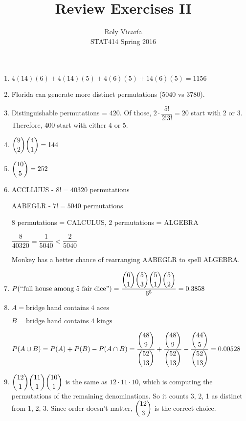 \documentclass{article}
\title{Review Exercises II}
\author{Roly Vicar\'ia \\ STAT414 Spring 2016}
\begin{document}
    
    \maketitle
    
    \begin{enumerate}
     \item
      $4(14)(6) + 4(14)(5) + 4(6)(5) + 14(6)(5) = 1156$
     
     \item
      Florida can generate more distinct permutations (5040 vs 3780).
      
     \item
      Distinguishable permutations = $420$. Of those, $2\cdot\dfrac{5!}{2!3!} = 20$ start with 2 or 3.
      Therefore, 400 start with either 4 or 5.
     
     \item
      $\dbinom{9}{2}\dbinom{4}{1} = 144$
     
     \item
      $\dbinom{10}{5} = 252$
     
     \item
      ACCLLUUS - $8! = 40320$ permutations
      
      AABEGLR - $7! = 5040$ permutations 
      
      8 permutations = CALCULUS, 2 permutations = ALGEBRA 
      
      $\dfrac{8}{40320} = \dfrac{1}{5040} < \dfrac{2}{5040}$
      
      Monkey has a better chance of rearranging AABEGLR to spell ALGEBRA.
     
     \item
      $P(\text{``full house among 5 fair dice''}) 
	= \dfrac{\dbinom{6}{1}\dbinom{5}{3}\dbinom{5}{1}\dbinom{5}{2}}{6^5} = 0.3858$
     
     \item
      $A = \text{bridge hand contains 4 aces}$
      
      $B = \text{bridge hand contains 4 kings}$
      
      $P(A \cup B) = P(A) + P(B) - P(A \cap B) = \dfrac{\dbinom{48}{9}}{\dbinom{52}{13}}
	+ \dfrac{\dbinom{48}{9}}{\dbinom{52}{13}} - \dfrac{\dbinom{44}{5}}{\dbinom{52}{13}}
	= 0.00528$
     
     \item
      $\dbinom{12}{1}\dbinom{11}{1}\dbinom{10}{1}$ is the same as $12\cdot11\cdot 10$, which 
      is computing the permutations of the remaining denominations. So it counts 3, 2, 1 as 
      distinct from 1, 2, 3. Since order doesn't matter, $\dbinom{12}{3}$ is the correct
      choice.
     

\end{enumerate}
\end{document}
